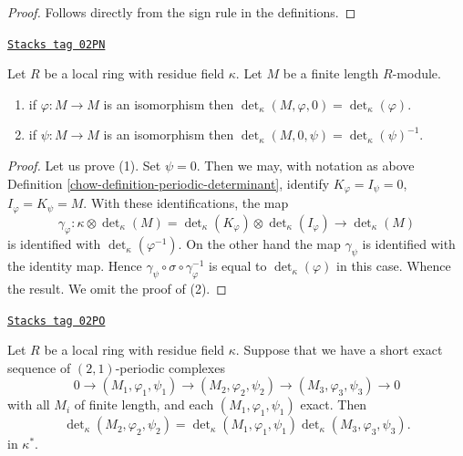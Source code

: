 \begin{proof}
Follows directly from the sign rule in the definitions.
\end{proof}

\begin{lemma}
\label{chow-lemma-periodic-determinant-easy-case}
\href{https://stacks.math.columbia.edu/tag/02PN}{\texttt{Stacks tag 02PN}}

Let $R$ be a local ring with residue field $\kappa$.
Let $M$ be a finite length $R$-module.
\begin{enumerate}
\item if $\varphi : M \to M$ is an isomorphism then
$\det_\kappa(M, \varphi, 0) = \det_\kappa(\varphi)$.
\item if $\psi : M \to M$ is an isomorphism then
$\det_\kappa(M, 0, \psi) = \det_\kappa(\psi)^{-1}$.
\end{enumerate}
\end{lemma}

\begin{proof}

Let us prove (1). Set $\psi = 0$. Then we may, with notation
as above Definition \ref{chow-definition-periodic-determinant}, identify
$K_\varphi = I_\psi = 0$, $I_\varphi = K_\psi = M$.
With these identifications, the map
$$
\gamma_\varphi :
\kappa \otimes \det\nolimits_\kappa(M)
=
\det\nolimits_\kappa(K_\varphi)
\otimes
\det\nolimits_\kappa(I_\varphi)
\longrightarrow
\det\nolimits_\kappa(M)
$$
is identified with $\det_\kappa(\varphi^{-1})$. On the other hand the
map $\gamma_\psi$ is identified with the identity map. Hence
$\gamma_\psi \circ \sigma \circ \gamma_\varphi^{-1}$ is equal
to $\det_\kappa(\varphi)$ in this case. Whence the result.
We omit the proof of (2).
\end{proof}

\begin{lemma}
\label{chow-lemma-periodic-determinant}
\href{https://stacks.math.columbia.edu/tag/02PO}{\texttt{Stacks tag 02PO}}

Let $R$ be a local ring with residue field $\kappa$.
Suppose that we have a short exact sequence of
$(2, 1)$-periodic complexes
$$
0 \to (M_1, \varphi_1, \psi_1)
\to (M_2, \varphi_2, \psi_2)
\to (M_3, \varphi_3, \psi_3)
\to 0
$$
with all $M_i$ of finite length, and each $(M_1, \varphi_1, \psi_1)$ exact.
Then
$$
\det\nolimits_\kappa(M_2, \varphi_2, \psi_2) =
\det\nolimits_\kappa(M_1, \varphi_1, \psi_1)
\det\nolimits_\kappa(M_3, \varphi_3, \psi_3).
$$
in $\kappa^*$.
\end{lemma}

